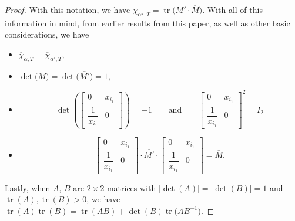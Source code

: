 \documentclass[10pt,a4paper]{amsart}
\numberwithin{equation}{section}
\theoremstyle{definition}
\begin{document}
\begin{proof}
With this notation, we have $\overline{\chi}_{\alpha^2, T}=\operatorname{tr}\bigl(\overline{M'}\cdot \overline{M}\bigr)$. With all of this information in mind, from earlier results from this paper, as well as other basic considerations, we have
\begin{itemize}\itemsep=0pt
 \item $\overline{\chi}_{\alpha, T}=\overline{\chi}_{\alpha', T}$,
 \item $\det\bigl(\overline{M}\bigr)=\det\bigl(\overline{M'}\bigr)=1$,
 \item
 \[
 \det\left(\begin{bmatrix}
 0 & x_{i_1}\\
 \dfrac{1}{x_{i_1}} & 0
\end{bmatrix}\right)=-1\qquad \text{and}\qquad \begin{bmatrix}
 0 & x_{i_1}\\
 \dfrac{1}{x_{i_1}} & 0
\end{bmatrix}^2=I_2\]
\item \[
\begin{bmatrix}
 0 & x_{i_1}\\
 \dfrac{1}{x_{i_1}} & 0
\end{bmatrix}\cdot \overline{M'}\cdot
\begin{bmatrix}
 0 & x_{i_1}\\
 \dfrac{1}{x_{i_1}} & 0
\end{bmatrix}=\overline{M}.\]
\end{itemize}
 Lastly, when $A$, $B$ are $2\times 2$ matrices with $|{\det(A)}|=|{\det(B)}|=1$ and $\operatorname{tr}(A), \operatorname{tr}(B)>0$, we have $\operatorname{tr}(A)\operatorname{tr}(B)=\operatorname{tr}(AB)+\det(B)\operatorname{tr}\bigl(AB^{-1}\bigr)$.


\end{proof}
\end{document}
